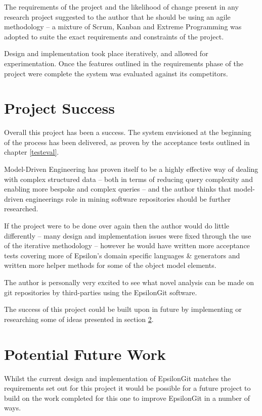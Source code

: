 \documentclass[11pt]{book}
\begin{document}
The requirements of the project and the likelihood of change present in any research project suggested to the author that he should be using an agile methodology -- a mixture of Scrum, Kanban and Extreme Programming was adopted to suite the exact requirements and constraints of the project.

Design and implementation took place iteratively, and allowed for experimentation. Once the features outlined in the requirements phase of the project were complete the system was evaluated against its competitors.

\section{Project Success}
Overall this project has been a success. The system envisioned at the beginning of the process has been delivered, as proven by the acceptance tests outlined in chapter \ref{testeval}.

Model-Driven Engineering has proven itself to be a highly effective way of dealing with complex structured data -- both in terms of reducing query complexity and enabling more bespoke and complex queries -- and the author thinks that model-driven engineerings role in mining software repositories should be further researched.

If the project were to be done over again then the author would do little differently -- many design and implementation issues were fixed through the use of the iterative methodology -- however he would have written more acceptance tests covering more of Epsilon's domain specific languages \& generators and written more helper methods for some of the object model elements.

The author is personally very excited to see what novel analysis can be made on git repositories by third-parties using the EpsilonGit software.

The success of this project could be built upon in future by implementing or researching some of ideas presented in section \ref{potentialfuturework}.

\section{Potential Future Work}
\label{potentialfuturework}
Whilst the current design and implementation of EpsilonGit matches the requirements set out for this project it would be possible for a future project to build on the work completed for this one to improve EpsilonGit in a number of ways. 
\end{document}
